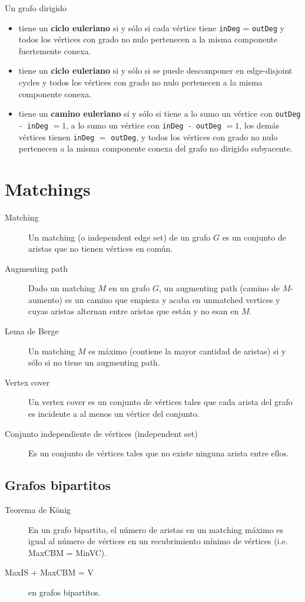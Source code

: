 	Un grafo dirigido
	\begin{itemize}
		\item tiene un \textbf{ciclo euleriano} si y sólo si cada vértice tiene \texttt{inDeg} = \texttt{outDeg} y todos los vértices con grado no nulo pertenecen a la misma componente fuertemente conexa.
		\item tiene un \textbf{ciclo euleriano} si y sólo si se puede descomponer en edge-disjoint cycles y todos los vértices con grado no nulo pertenecen a la misma componente conexa.
		\item tiene un \textbf{camino euleriano} si y sólo si tiene a lo sumo un vértice con \texttt{outDeg - inDeg} $= 1$, a lo sumo un vértice con \texttt{inDeg - outDeg} $= 1$, los demás vértices tienen \texttt{inDeg} $=$ \texttt{outDeg}, y todos los vértices con grado no nulo pertenecen a la misma componente conexa del grafo no dirigido subyacente.
	\end{itemize}


\section{Matchings}
	\begin{description} 
		\item[Matching] Un matching (o independent edge set) de un grafo $G$ es un conjunto de aristas que no tienen vértices en común.
		\item[Augmenting path] Dado un matching $M$ en un grafo $G$, un augmenting path (camino de $M$-aumento) es un camino que empieza y acaba en unmatched vertices y cuyas aristas alternan entre aristas que están y no esan en $M$.
		\item[Lema de Berge] Un matching $M$ es máximo (contiene la mayor cantidad de aristas) si y sólo si no tiene un augmenting path.
		\item[Vertex cover] Un vertex cover es un conjunto de vértices tales que cada arista del grafo es incidente a al menos un vértice del conjunto.
		\item[Conjunto independiente de vértices (independent set)] Es un conjunto de vértices tales que no existe ninguna arista entre ellos.	
	\end{description}

	\subsection{Grafos bipartitos}
		\begin{description}
			\item[Teorema de König] En un grafo bipartito, el número de aristas en un matching máximo es igual al número de vértices en un recubrimiento mínimo de vértices (i.e. MaxCBM = MinVC).
			\item[MaxIS + MaxCBM = V] en grafos bipartitos.
		\end{description}
	
